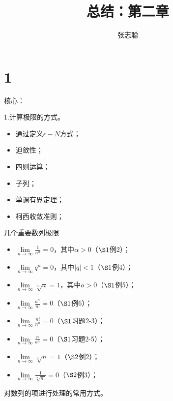 \documentclass{article}
\begin{document}
\title{总结：第二章}
\author{张志聪}
\maketitle

\section*{1}

\begin{zremark}
  核心：

  1.计算极限的方式。
\end{zremark}

\begin{itemize}
  \item 通过定义$\epsilon - N$方式；
  \item 迫敛性；
  \item 四则运算；
  \item 子列；
  \item 单调有界定理；
  \item 柯西收敛准则；
\end{itemize}

\begin{zremark}
  几个重要数列极限
\end{zremark}

\begin{itemize}
  \item $\lim\limits_{n \to \infty} \frac{1}{n^\alpha} = 0$，其中$\alpha > 0$（$\S 1$例2）；
  \item $\lim\limits_{n \to \infty} q^n = 0$，其中$|q| < 1$（$\S 1$例4）；
  \item $\lim\limits_{n \to \infty} \sqrt[n]{a} = 1$，其中$a > 0$（$\S 1$例5）；
  \item $\lim\limits_{n \to \infty} \frac{a^n}{n!} = 0$（$\S 1$例6）；
  \item $\lim\limits_{n \to \infty} \frac{n!}{n^n} = 0$（$\S 1$习题2-3）；
  \item $\lim\limits_{n \to \infty} \frac{n}{a^n} = 0$（$\S 1$习题2-5）；
  \item $\lim\limits_{n \to \infty} \sqrt[n]{n} = 1$（$\S 2$例2）；
  \item $\lim\limits_{n \to \infty} \frac{1}{\sqrt[n]{n!}} = 0$（$\S 2$例3）；
\end{itemize}

\begin{zremark}
  对数列的项进行处理的常用方式。
\end{zremark}
\end{document}
